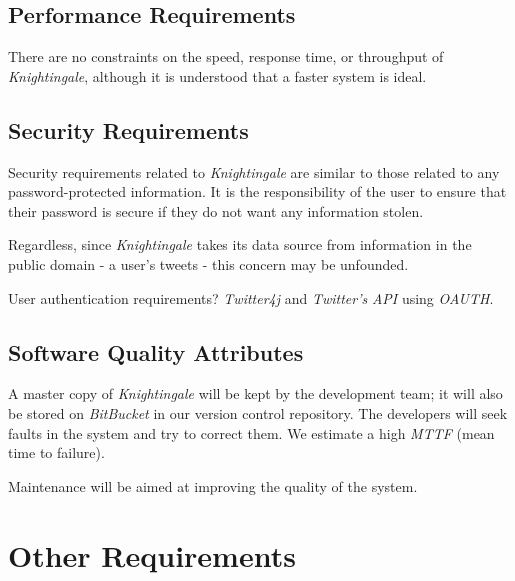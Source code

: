 \documentclass[a4paper, 12pt]{article}
\begin{document}
\subsection{Performance Requirements} \label{sec:performance}
\begin{adjustwidth}{2em}{0pt}
There are no constraints on the speed, response time, or throughput of \textit{Knightingale}, although it is understood that a faster system is ideal.
\end{adjustwidth}

\subsection{Security Requirements} \label{sec:security}
\begin{adjustwidth}{2em}{0pt}
Security requirements related to \textit{Knightingale} are similar to those related to any password-protected information. It is the responsibility of the user to ensure that their password is secure if they do not want any information stolen. \newline

\noindent Regardless, since \textit{Knightingale} takes its data source from information in the public domain - a user's tweets - this concern may be unfounded. \newline

\noindent User authentication requirements? \newline
\noindent \textit{Twitter4j} and \textit{Twitter's} \textit{API} using \textit{OAUTH}.
\end{adjustwidth} 

\subsection{Software Quality Attributes} \label{sec:quality}
\begin{adjustwidth}{2em}{0pt}
A master copy of \textit{Knightingale} will be kept by the development team; it will also be stored on \textit{BitBucket} in our version control repository. The developers will seek faults in the system and try to correct them. We estimate a high \textit{MTTF} (mean time to failure). \newline

\noindent Maintenance will be aimed at improving the quality of the system. 
\end{adjustwidth}

\section{Other Requirements} \label{sec:other}
\end{document}
